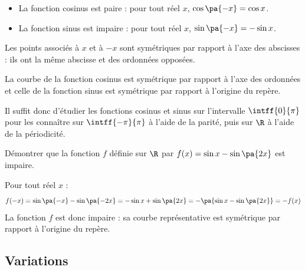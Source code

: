 \begin{prop}
	\nline
	\begin{itemize}
		\item La fonction cosinus est paire : pour tout réel $x$, $\cos\pa{-x} = \cos x$.
		\item La fonction sinus est impaire : pour tout réel $x$, $\sin\pa{-x} = -\sin x$.
	\end{itemize}
\end{prop}

\begin{demo}
	Les points associés à $x$ et à $-x$ sont symétriques par rapport à l'axe des abscisses : ils ont la même abscisse et des ordonnées opposées.
\end{demo}

\begin{rem}
	La courbe de la fonction cosinus est symétrique par rapport à l'axe des ordonnées et celle de la fonction sinus est symétrique par rapport à l'origine du repère.

	Il suffit donc d'étudier les fonctions cosinus et sinus sur l'intervalle $\intff{0}{\pi}$ pour les connaître sur $\intff{-\pi}{\pi}$ à l'aide de la parité, puis sur $\R$ à l'aide de la périodicité.
\end{rem}

\begin{methode}
	Démontrer que la fonction $f$ définie sur $\R$ par $f(x) = \sin x - \sin\pa{2x}$ est impaire.

	\begin{correction}
		Pour tout réel $x$ :
		\[
			f(-x) = \sin\pa{-x} - \sin\pa{-2x} = -\sin x + \sin\pa{2x} = -\pa{\sin x - \sin\pa{2x}} = -f(x)
		\]
		La fonction $f$ est donc impaire : sa courbe représentative est symétrique par rapport à l'origine du repère.
	\end{correction}
\end{methode}

\subsection{Variations}

